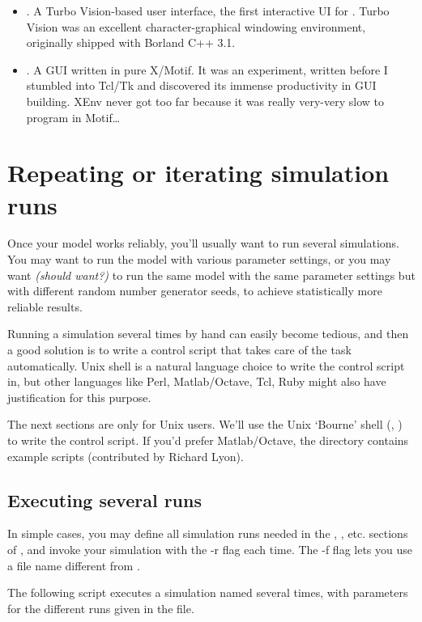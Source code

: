 \begin{itemize}
  \item {}. A Turbo Vision-based user interface, the first
    interactive UI for {\opp}. Turbo Vision was an excellent
    character-graphical windowing environment, originally shipped with
    Borland C++ 3.1.
  \item {}. A GUI written in pure X/Motif. It was an
    experiment, written before I stumbled into Tcl/Tk and discovered
    its immense productivity in GUI building. XEnv never got too far
    because it was really very-very slow to program in Motif\dots
\end{itemize}


\section{Repeating or iterating simulation runs}

Once your model works reliably, you'll usually want to run several
simulations. You may want to run the model with various
parameter settings, or you may want \textit{(should want?)} to
run the same model with the same parameter settings but with
different random number generator seeds, to achieve statistically
more reliable results.

Running a simulation several times by hand can easily become tedious,
and then a good solution is to write a control script that
takes care of the task automatically. Unix shell is
a natural language choice to write the control script in,
but other languages like Perl, Matlab/Octave, Tcl, Ruby might also have
justification for this purpose.

The next sections are only for Unix users. We'll use the
Unix `Bourne' shell (, ) to write the control script.
If you'd prefer Matlab/Octave, the  directory
contains example scripts (contributed by Richard Lyon).


\subsection{Executing several runs}

In simple cases, you may define all simulation runs needed in the
\ttt{[Run 1]}, \ttt{[Run 2]}, etc. sections of ,
and invoke your simulation with the -r flag each time.
The -f flag lets you use a file name different from .

The following script executes a simulation named 
several times, with parameters for the different runs
given in the  file.

